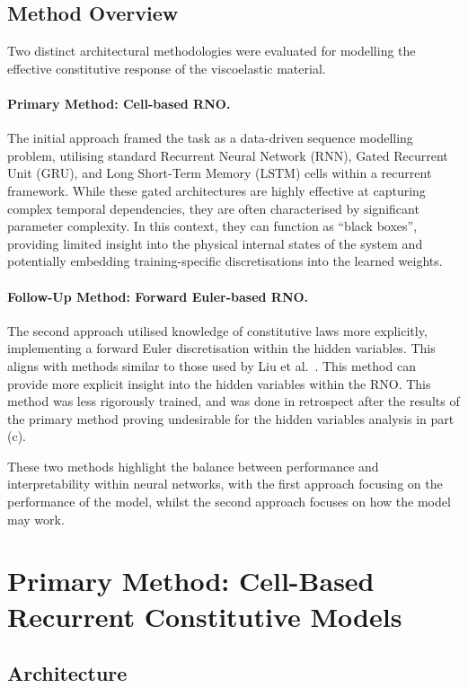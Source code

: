 \documentclass[11pt,a4paper, onecolumn]{article}
\begin{document}
\subsection{Method Overview}

Two distinct architectural methodologies were evaluated for modelling the effective constitutive response of the viscoelastic material.

\paragraph{Primary Method: Cell-based RNO.} The initial approach framed the task as a data-driven sequence modelling problem, utilising standard Recurrent Neural Network (RNN), Gated Recurrent Unit (GRU), and Long Short-Term Memory (LSTM) cells within a recurrent framework. While these gated architectures are highly effective at capturing complex temporal dependencies, they are often characterised by significant parameter complexity. In this context, they can function as ``black boxes'', providing limited insight into the physical internal states of the system and potentially embedding training-specific discretisations into the learned weights.

\paragraph{Follow-Up Method: Forward Euler-based RNO.} The second approach utilised knowledge of constitutive laws more explicitly, implementing a forward Euler discretisation within the hidden variables. This aligns with methods similar to those used by Liu et al.~\cite{Liu_2023}. This method can provide more explicit insight into the hidden variables within the RNO. This method was less rigorously trained, and was done in retrospect after the results of the primary method proving undesirable for the hidden variables analysis in part (c).

These two methods highlight the balance between performance and interpretability within neural networks, with the first approach focusing on the performance of the model, whilst the second approach focuses on how the model may work.

\section{Primary Method: Cell-Based Recurrent Constitutive Models}

\subsection{Architecture}
\end{document}
